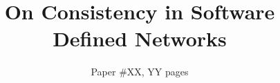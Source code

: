\documentclass{sig-alternate-10pt-2013}
\title{On Consistency in Software Defined Networks}
\author{
Paper \#XX, YY pages
}
\begin{document}
\maketitle

\newcommand{\paragraphb}[1]{\vspace{0.03in}\noindent{\bf #1} }
\newcommand{\paragraphe}[1]{\vspace{0.03in}\noindent{\em #1} }
\newcommand{\paragraphbe}[1]{\vspace{0.03in}\noindent{\bf \em #1} }

\newcommand{\prooffontsize}{\fontsize{8pt}{9.3pt}\selectfont}
\newcommand{\cready}{\textcolor{black}}
\newcommand{\newcomment}{\textcolor{black}}

\newcommand{\cycomment}{\textcolor{black}}
\newcommand{\matt}[1]{{\color{black}{#1}}}
\newcommand{\codecomment}{\textcolor{commentgreen}}


\newcommand{\swan}{\normalsize S{\small WAN}\xspace}
\newcommand{\swansmall}{\small S{\scriptsize WAN}\xspace}
\newcommand{\cflow}{Vflow\xspace}
\newcommand{\flow}{vflow\xspace}
\newcommand{\flows}{vflows\xspace}

\newcommand{\topolarge}{\textsf{IDN}\xspace}
\newcommand{\toposmall}{\textsf{G-Scale}\xspace}

\newcommand{\corule}{Rule\xspace}
\newcommand{\orule}{rule\xspace}
\newcommand{\orules}{rules\xspace}

\newcommand{\cpr}{Service\xspace}
\newcommand{\pr}{service\xspace}

\newcommand{\cprops}{Service properties\xspace}
\newcommand{\props}{service properties\xspace}

\newcommand{\trurl}{\url{http://somewhere}}

\newcommand{\fixme}[1]{{\bf\textcolor{red}{[#1]}}}

\newcommand{\helpme}[1]{{\bf\textcolor{red}{#1}}}

\newcommand{\figtocapskip}{\vspace{-6pt}}
\newcommand{\figtocapbigskip}{\vspace{-9pt}}

\theoremstyle{definition}
\newtheorem{lemma}{Lemma}


\begin{sloppypar}

{
\scriptsize
\baselineskip=7.685bp


}
%

\end{sloppypar}
\end{document}
